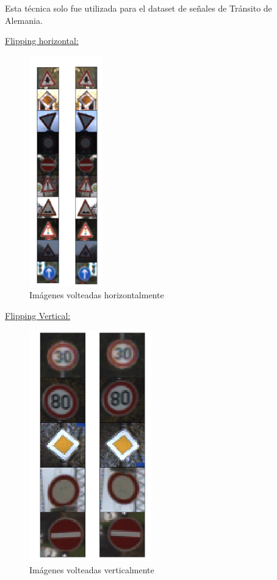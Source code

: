 			Esta técnica solo fue utilizada para el dataset de señales de Tránsito de Alemania.
			\begin{multicols}{2}
				\underline{Flipping horizontal:}
				\vspace{-0.5cm}
				\begin{figure}[H]
					\begin{center}
					\includegraphics[height=10cm ]{images/desarrollo/Augment/flippedHorizontally}
					\end{center}
					\begin{center}
					\caption{\small{Imágenes volteadas horizontalmente}}
					{\small{\fontsize{10}{16.8}\selectfont {Fuente: Elaboración propia}}}
					\end{center}
					\vspace{-1.5em}
				\end{figure}

			
				\underline{Flipping Vertical:}
				\begin{figure}[H]
					\begin{center}
					\includegraphics[height=10cm]{images/desarrollo/Augment/flippableVertically}
					\end{center}
					\begin{center}
					\caption{\small{Imágenes volteadas verticalmente}}
					

\end{center}
\end{figure}
\end{multicols}
